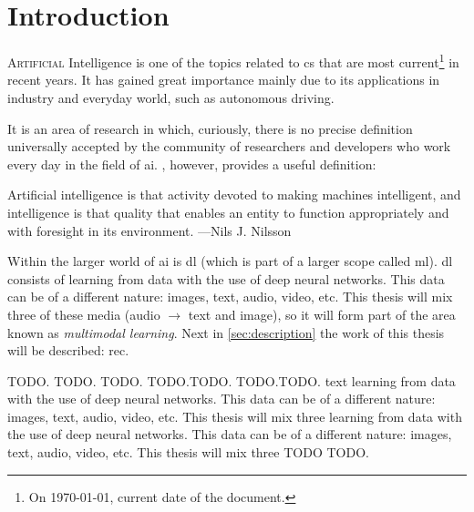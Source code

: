 

\chapter{Introduction}\label{cha:intro}


\lettrine{A}{rtificial} Intelligence is one of the topics related to \gls{cs}
that are most current\footnote{On \today, current date of the document.} in
recent years. It has gained great importance mainly due to its applications in
industry and everyday world, such as autonomous driving.

It is an area of research in which, curiously, there is no precise definition
universally accepted by the community of researchers and developers who work
every day in the field of \gls{ai}. ,
however, provides a useful definition:

\begin{quoteBox}
  Artificial intelligence is that activity devoted to making machines
  intelligent, and intelligence is that quality that enables an entity to
  function appropriately and with foresight in its environment.
  \tcblower{}
  ---Nils J. Nilsson
\end{quoteBox}

Within the larger world of \gls{ai} is \gls{dl} (which is part of a larger
scope called \gls{ml}). \gls{dl} consists of learning from data with the use of
deep neural networks. This data can be of a different nature: images, text,
audio, video, etc. This thesis will mix three of these media (audio
\(\rightarrow\) text and image), so it will form part of the area known as
\emph{multimodal learning}. Next in \vref{sec:description} the work of this
thesis will be described: \gls{rec}.%

TODO. TODO. TODO. TODO.TODO. TODO.TODO. text learning from data with the use of
deep neural networks. This data can be of a different nature: images, text,
audio, video, etc. This thesis will mix three learning from data with the use
of deep neural networks. This data can be of a different nature: images, text,
audio, video, etc. This thesis will mix three TODO TODO.


